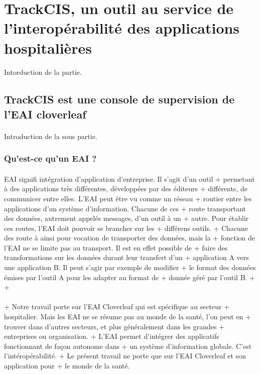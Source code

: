 \section{TrackCIS, un outil au service de l'interopérabilité des applications hospitalières}
	\paragraph{}
	Intorduction de la partie.

	\subsection{TrackCIS est une console de supervision de l'EAI cloverleaf}
		\paragraph{}
		Introduction de la sous partie.
		
		\subsubsection{Qu'est-ce qu'un EAI ?}
			\paragraph{}
			EAI signifi intégration d'application d'entreprise. Il s'agit d'un outil
 +			permetant à des applications très différentes, développées par des éditeurs
 +			différents, de communicer entre elles. L'EAI peut être vu comme un réseau
 +			routier entre les applications d'un système d'information. Chacune de ces
 +			route transportant des données, autrement appelés messages, d'un outil à un
 +			autre. Pour établir ces routes, l'EAI doit pouvoir se brancher sur les
 +			différens outils.
 +			Chacune des route à ainsi pour vocation de transporter des données, mais la
 +			fonction de l'EAI ne se limite pas au transport. Il est en effet possible de
 +			faire des transformations sur les données durant leur transfert d'un
 +			application A vers une application B. Il peut s'agir par exemple de modifier
 +			le format des données émises par l'outil A pour les adapter au format de
 +			donnée géré par l'outil B.
 +			
 +			\paragraph{} %
 +			Notre travail porte sur l'EAI Cloverleaf qui est spécifique au secteur
 +			hospitalier. Mais les EAI ne se résume pas au monde de la santé, l'on peut en
 +			trouver dans d'autres secteurs, et plus généralement dans les grandes
 +			entreprises ou organisation.
 +			L'EAI permet d'intégrer des applicatifs fonctionnant de façon autonome dans
 +			un système d'information globale. C'est l'intéropérabilité.
 +			Le présent travail ne porte que sur l'EAI Cloverleaf et son application pour
 +			le monde de la santé.

